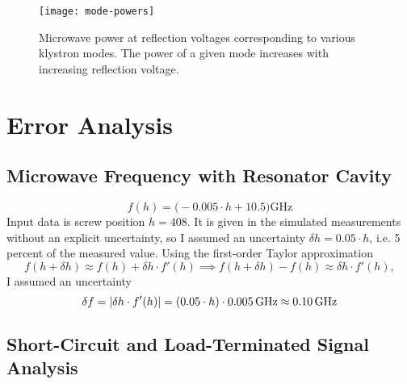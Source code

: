 \documentclass[11pt, a4paper]{article}
\begin{document}
\begin{figure}
	\texttt{[image: mode-powers]}
	\caption{Microwave power at reflection voltages corresponding to various klystron modes. The power of a given mode increases with increasing reflection voltage.}
	\label{mikval:fig:power}
\end{figure}



\section{Error Analysis}

\subsection{Microwave Frequency with Resonator Cavity}
\begin{equation*}
	f(h) = \big(- 0.005 \cdot h + 10.5 \big) \si{\giga \hertz}
\end{equation*}
Input data is screw position $ h = 408$. It is given in the simulated measurements without an explicit uncertainty, so I assumed an uncertainty $ \delta h = 0.05 \cdot h $, i.e. 5 percent of the measured value. Using the first-order Taylor approximation
\begin{equation*}
	f(h + \delta h) \approx f(h) + \delta h \cdot f'(h) \implies f(h + \delta h) - f(h) \approx \delta h \cdot f'(h),
\end{equation*}
I assumed an uncertainty
\begin{equation*}
	\delta f = \abs{\delta h \cdot f'(h)} = (0.05 \cdot h) \cdot \SI{0.005}{\giga \hertz} \approx \SI{0.10}{\giga \hertz} 
\end{equation*}

\subsection{Short-Circuit and Load-Terminated Signal Analysis}
\end{document}
